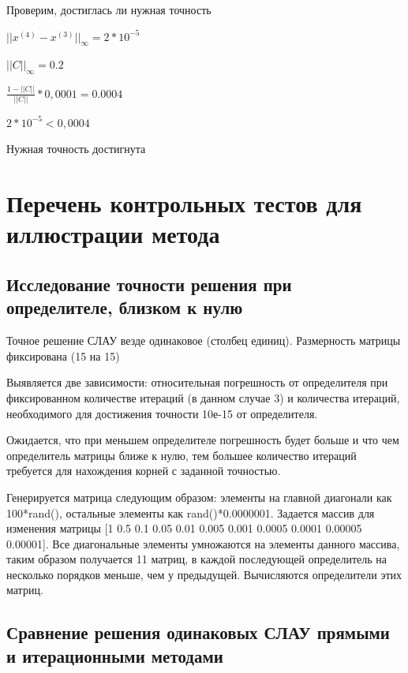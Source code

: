 Проверим, достиглась ли нужная точность

\begin{math}
	||x^{(4)}-x^{(3)}||_{\infty}=2*10^{-5}
\end{math}

\begin{math}
	||C||_{\infty}=0.2
\end{math}

\begin{math}
	\frac{1-||C||}{||C||}*0,0001=0.0004
\end{math}


\begin{math}
	2*10^{-5}<0,0004
\end{math}

Нужная точность достигнута
\section{Перечень контрольных тестов для иллюстрации метода}

\subsection{Исследование точности решения при определителе, близком к нулю}

Точное решение СЛАУ везде одинаковое (столбец единиц). Размерность матрицы фиксирована (15 на 15)

Выявляется две зависимости: относительная погрешность от определителя при фиксированном количестве итераций (в данном случае 3) и количества итераций, необходимого для достижения точности 10е-15 от определителя. 

Ожидается, что при меньшем определителе погрешность будет больше и что чем определитель матрицы ближе к нулю, тем большее количество итераций требуется для нахождения корней с заданной точностью.

Генерируется матрица следующим образом: элементы на главной диагонали как 100*rand(), остальные элементы как rand()*0.0000001. Задается массив для изменения матрицы [1 0.5 0.1 0.05 0.01 0.005 0.001 0.0005 0.0001 0.00005 0.00001]. Все диагональные элементы умножаются на элементы данного массива, таким образом получается 11 матриц, в каждой последующей определитель на несколько порядков меньше, чем у предыдущей. Вычисляются определители этих матриц. 

\subsection{Сравнение решения одинаковых СЛАУ прямыми и итерационными методами}

